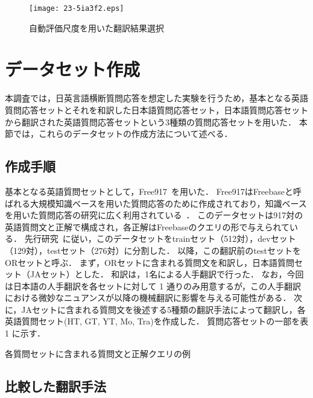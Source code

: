 \documentclass[japanese]{jnlp_1.4}
\begin{document}
\begin{figure}[t]
\begin{center}
\texttt{[image: 23-5ia3f2.eps]}
\end{center}
\caption{自動評価尺度を用いた翻訳結果選択}
\label{fig:how2exp2}
\end{figure}


\section{データセット作成}
\label{sec:dataset}

本調査では，日英言語横断質問応答を想定した実験を行うため，基本となる英語質問応答セットとそれを和訳した日本語質問応答セット，日本語質問応答セットから翻訳された英語質問応答セットという3種類の質問応答セットを用いた．
本節では，これらのデータセットの作成方法について述べる．


\subsection{作成手順}

基本となる英語質問セットとして，Free917~\cite{cai2013}を用いた．
Free917はFreebaseと呼ばれる大規模知識ベースを用いた質問応答のために作成されており，知識ベースを用いた質問応答の研究に広く利用されている~\cite{cai2013,berant2013}．
このデータセットは917対の英語質問文と正解で構成され，各正解はFreebaseのクエリの形で与えられている．
先行研究~\cite{cai2013}に従い，このデータセットをtrainセット（512対），devセット（129対），testセット（276対）に分割した．
以降，この翻訳前のtestセットをORセットと呼ぶ．
まず，ORセットに含まれる質問文を和訳し，日本語質問セット（JAセット）とした．
和訳は，1名による人手翻訳で行った．
なお，今回は日本語の人手翻訳を各セットに対して 1 通りのみ用意するが，この人手翻訳における微妙なニュアンスが以降の機械翻訳に影響を与える可能性がある．
次に，JAセットに含まれる質問文を後述する5種類の翻訳手法によって翻訳し，各英語質問セット(HT, GT, YT, Mo, Tra)を作成した．
質問応答セットの一部を表 1 に示す．

\begin{table}[t]
\caption{各質問セットに含まれる質問文と正解クエリの例}
\label{tb:testSetExample}

\end{table}


\subsection{比較した翻訳手法}
\label{sec:MTsystems}
\end{document}
